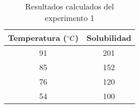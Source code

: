 \documentclass[../main.tex]{subfiles}
\begin{document}
\begin{table}[H]
    \centering
    \begin{tabular}{c|c}
        \hline
        Temperatura ($\degree C$) & Solubilidad\\
        \hline
        91 & 201 \\
        85 & 152 \\
        76 & 120 \\
        54 & 100 \\
        \hline
    \end{tabular}
    \label{tab:results_1}
    \caption{Resultados calculados del experimento 1}
\end{table}
\end{document}
